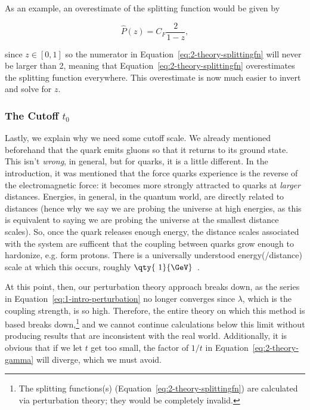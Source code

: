As an example, an overestimate of the splitting function would be given by

\begin{equation}
  \hat{P}(z) = C_F \frac{2}{1-z},\label{eq:2-theory-splittingfnover}
\end{equation}

since $z \in [0,1]$ so the numerator in Equation~\eqref{eq:2-theory-splittingfn} will never be larger than 2, meaning that Equation~\eqref{eq:2-theory-splittingfn} overestimates the splitting function everywhere. This overestimate is now much easier to invert and solve for $z$.

\subsubsection{The Cutoff \texorpdfstring{$t_0$}{t0}}\label{sec:2-theory-cutoff}

Lastly, we explain why we need some cutoff scale. We already mentioned beforehand that the quark emits gluons so that it returns to its ground state. This isn't \textit{wrong}, in general, but for quarks, it is a little different. In the introduction, it was mentioned that the force quarks experience is the reverse of the electromagnetic force: it becomes more strongly attracted to quarks at \textit{larger} distances. Energies, in general, in the quantum world, are directly related to distances (hence why we say we are probing the universe at high energies, as this is equivalent to saying we are probing the universe at the smallest distance scales). So, once the quark releases enough energy, the distance scales associated with the system are sufficent that the coupling between quarks grow enough to hardonize, e.g. form protons. There is a universally understood energy(/distance) scale at which this occurs, roughly $\qty{~1}{\GeV}$~\cite{Hoang_2024}.

At this point, then, our perturbation theory approach breaks down, as the series in Equation~\eqref{eq:1-intro-perturbation} no longer converges since $\lambda$, which is the coupling strength, is so high. Therefore, the entire theory on which this method is based breaks down,\footnote{The splitting functions(s) (Equation~\eqref{eq:2-theory-splittingfn}) are calculated via perturbation theory; they would be completely invalid.} and we cannot continue calculations below this limit without producing results that are inconsistent with the real world. Additionally, it is obvious that if we let $t$ get too small, the factor of $1/t$ in Equation~\eqref{eq:2-theory-gamma} will diverge, which we must avoid.


